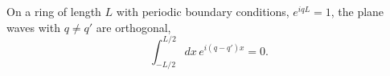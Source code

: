 \documentclass{article}
\begin{document}
On a ring of length $L$ with periodic boundary conditions, $e^{iqL}=1$, the plane waves
with $q \neq q'$ are orthogonal,
\begin{equation}
\int_{-L/2}^{L/2} dx\, e^{i(q-q')x} = 0 .
\label{eq:orth}
\end{equation}
\end{document}
